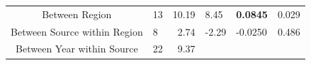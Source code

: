 \documentclass[fleqn,10pt,lineno]{wlpeerj} %
\theoremstyle{definition}
\theoremstyle{definition}
\theoremstyle{definition}
\theoremstyle{remark}
\begin{document}
\begin{longtable}[]{@{}clrllc@{}}
\begin{minipage}[b]{0.07\columnwidth}
\end{minipage}\tabularnewline
\midrule
\endhead
\begin{minipage}[t]{0.32\columnwidth}\centering\strut
Between Region\strut
\end{minipage} & \begin{minipage}[t]{0.06\columnwidth}\raggedright\strut
13\strut
\end{minipage} & \begin{minipage}[t]{0.07\columnwidth}\raggedleft\strut
10.19\strut
\end{minipage} & \begin{minipage}[t]{0.13\columnwidth}\raggedright\strut
8.45\strut
\end{minipage} & \begin{minipage}[t]{0.19\columnwidth}\raggedright\strut
\textbf{0.0845}\strut
\end{minipage} & \begin{minipage}[t]{0.07\columnwidth}\centering\strut
0.029\strut
\end{minipage}\tabularnewline
\begin{minipage}[t]{0.32\columnwidth}\centering\strut
Between Source within Region\strut
\end{minipage} & \begin{minipage}[t]{0.06\columnwidth}\raggedright\strut
8\strut
\end{minipage} & \begin{minipage}[t]{0.07\columnwidth}\raggedleft\strut
2.74\strut
\end{minipage} & \begin{minipage}[t]{0.13\columnwidth}\raggedright\strut
-2.29\strut
\end{minipage} & \begin{minipage}[t]{0.19\columnwidth}\raggedright\strut
-0.0250\strut
\end{minipage} & \begin{minipage}[t]{0.07\columnwidth}\centering\strut
0.486\strut
\end{minipage}\tabularnewline
\begin{minipage}[t]{0.32\columnwidth}\centering\strut
Between Year within Source\strut
\end{minipage} & \begin{minipage}[t]{0.06\columnwidth}\raggedright\strut
22\strut
\end{minipage} & \begin{minipage}[t]{0.07\columnwidth}\raggedleft\strut
9.37\strut
\end{minipage} & \begin{minipage}[t]{0.13\columnwidth}\raggedright\strut

\end{minipage}
\end{longtable}
\end{document}
